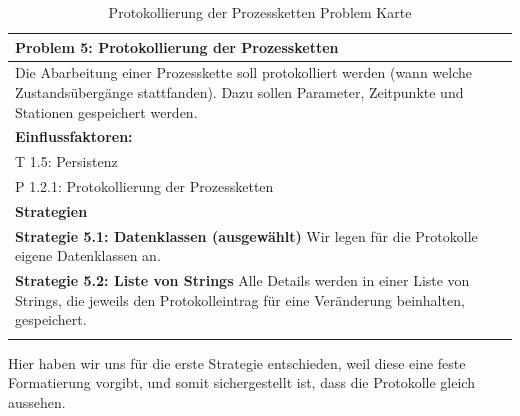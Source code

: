 \documentclass[enabledeprecatedfontcommands,fontsize=12pt,paper=a4,twoside]{scrartcl}
\begin{document}
\begin{table}[H]
    \centering
    \begin{tabular}{|p{15cm}|}
    \hline
          \textbf{Problem 5:} Protokollierung der Prozessketten
          \\ \hline
          Die Abarbeitung einer Prozesskette soll protokolliert werden (wann welche Zustandsübergänge stattfanden). Dazu sollen Parameter, Zeitpunkte und Stationen gespeichert werden. %
          \\ \hline
          \textbf{Einflussfaktoren: } \\
          T 1.5: Persistenz \\
          P 1.2.1: Protokollierung der Prozessketten\\
          \hline
          \textbf{Strategien} \\ \hline
            {}          
           \label{strategie:5.1}     
	\textbf{Strategie 5.1: Datenklassen (ausgewählt)} Wir legen für die Protokolle eigene Datenklassen an.\\
	  {}          
           \label{strategie:5.2}     
        \textbf{Strategie 5.2: Liste von Strings} Alle Details werden in einer Liste von Strings, die jeweils den Protokolleintrag für eine Veränderung beinhalten, gespeichert. \\
          \\ \hline
    \end{tabular}

    \caption{Protokollierung der Prozessketten Problem Karte}

    \label{tab:ProblemKarte5}
\end{table}

Hier haben wir uns  für die erste Strategie entschieden, weil diese eine feste Formatierung vorgibt, und somit sichergestellt ist, dass die Protokolle gleich aussehen.\\
\end{document}
